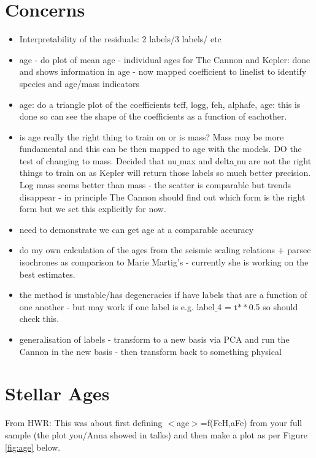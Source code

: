 \documentclass[11pt]{amsart}
\begin{document}
\section{Concerns}
\begin{itemize}
\item Interpretability of the residuals: 2 labels/3 labels/ etc
\item age - do plot of mean age - individual ages for The Cannon and Kepler: done and shows information in age - now mapped coefficient to linelist to identify species and age/mass indicators \\
\item age: do a triangle plot of the coefficients teff, logg, feh, alphafe, age: this is done so can see the shape of the coefficients as a function of eachother. \\ 
\item is age really the right thing to train on or is mass? Mass may be more fundamental and this can be then mapped to age with the models. DO the test of changing to mass. Decided that nu$\_$max and delta$\_$nu are not the right things to train on as Kepler will return those labels so much better precision. Log mass seems better than mass - the scatter is comparable but trends disappear - in principle The Cannon should find out which form is the right form but we set this explicitly for now. 
\item need to demonstrate we can get age at a comparable accuracy
\item  do my own calculation of the ages from the seismic scaling relations + parsec isochrones as comparison to Marie Martig's - currently she is working on the best estimates. 
\item the method is unstable/has degeneracies if have labels that are a function of one another - but may work if one label is e.g. label$\_$4 = t$**$0.5 so should check this. 
\item generalisation of labels - transform to a new basis via PCA and run the Cannon in the new basis - then transform back to something physical 
\end{itemize} 

\section{Stellar Ages}

 From HWR: This was about first defining $<$age$>$=f(FeH,aFe) from your full
 sample (the plot you/Anna showed in talks) and
 then make a plot as per Figure \ref{fig:age} below. \\
 
\end{document}

